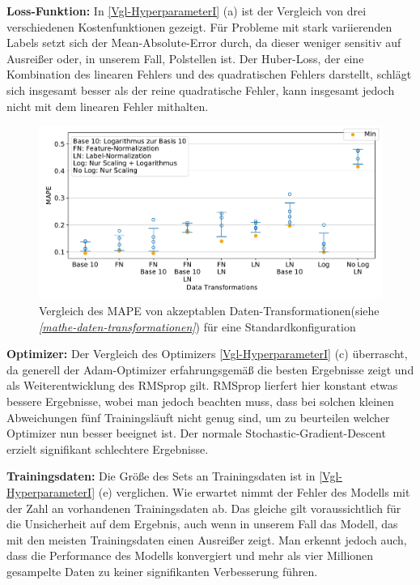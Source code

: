 \textbf{Loss-Funktion:}
In \textsf{\autoref{Vgl-HyperparameterI} (a)}  ist der Vergleich von drei verschiedenen Kostenfunktionen gezeigt. Für Probleme mit stark variierenden Labels setzt sich der Mean-Absolute-Error durch, da dieser weniger sensitiv auf Ausreißer oder, in unserem Fall, Polstellen ist. Der Huber-Loss\cite{huber}, der eine Kombination des linearen Fehlers und des quadratischen Fehlers darstellt, schlägt sich insgesamt besser als der reine quadratische Fehler, kann insgesamt jedoch nicht mit dem linearen Fehler mithalten. 
\begin{figure}[bt!] %
	\centering
	\includegraphics[width=14cm]{graphics/17,18}
	\caption{Vergleich des MAPE von akzeptablen Daten-Transformationen(siehe \textit{\autoref{mathe-daten-transformationen}}) für eine Standardkonfiguration}
	\label{Daten-Transformationen}
\end{figure}

\textbf{Optimizer:} Der Vergleich des Optimizers \textsf{\autoref{Vgl-HyperparameterI} (c)} überrascht, da generell der Adam-Optimizer\cite{Adam} erfahrungsgemäß die besten Ergebnisse zeigt und als Weiterentwicklung des RMSprop\cite{RMSprop} gilt. RMSprop lierfert hier konstant etwas bessere Ergebnisse, wobei man jedoch beachten muss, dass bei solchen kleinen Abweichungen fünf Trainingsläuft nicht genug sind, um zu beurteilen welcher Optimizer nun besser beeignet ist. Der normale Stochastic-Gradient-Descent erzielt signifikant schlechtere Ergebnisse. 

\textbf{Trainingsdaten:}
Die Größe des Sets an Trainingsdaten ist in \textsf{\autoref{Vgl-HyperparameterI} (e)}  verglichen. Wie erwartet nimmt der Fehler des Modells mit der Zahl an vorhandenen Trainingsdaten ab. Das gleiche gilt voraussichtlich für die Unsicherheit auf dem Ergebnis, auch wenn in unserem Fall das Modell, das mit den meisten Trainingsdaten einen Ausreißer zeigt. Man erkennt jedoch auch, dass die Performance des Modells konvergiert und mehr als vier Millionen gesampelte Daten zu keiner signifikanten Verbesserung führen. 

